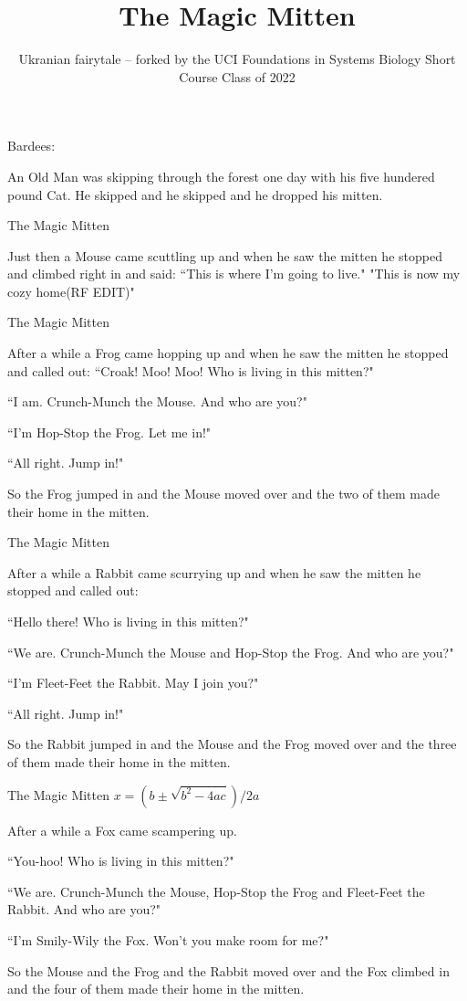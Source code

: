 \documentclass{article}
\title{The Magic Mitten}
\author{Ukranian fairytale -- forked by the UCI Foundations in Systems Biology Short Course Class of 2022}
\begin{document}
\maketitle


Bardees: 

An Old Man was skipping through the forest one day with his five hundered pound Cat. He skipped and he skipped and he dropped his mitten.

The Magic Mitten

Just then a Mouse came scuttling up and when he saw the mitten he stopped and climbed right in and said: ``This is where I'm going to live." "This is now my cozy home(RF EDIT)"

The Magic Mitten

After a while a Frog came hopping up and when he saw the mitten he stopped and called out:
``Croak! Moo! Moo! Who is living in this mitten?"

``I am. Crunch-Munch the Mouse. And who are you?"

``I'm Hop-Stop the Frog. Let me in!"

``All right. Jump in!"

So the Frog jumped in and the Mouse moved over and the two of them made their home in the mitten.

The Magic Mitten

After a while a Rabbit came scurrying up and when he saw the mitten he stopped and called out:

``Hello there! Who is living in this mitten?"

``We are. Crunch-Munch the Mouse and Hop-Stop the Frog. And who are you?"

``I'm Fleet-Feet the Rabbit. May I join you?"

``All right. Jump in!"

So the Rabbit jumped in and the Mouse and the Frog moved over and the three of them made their home in the mitten.

The Magic Mitten $x = \left(b \pm \sqrt{b^2-4ac} \right)/2a$

After a while a Fox came scampering up.

``You-hoo! Who is living in this mitten?"

``We are. Crunch-Munch the Mouse, Hop-Stop the Frog and Fleet-Feet the Rabbit. And who are you?"

``I'm Smily-Wily the Fox. Won't you make room for me?"

So the Mouse and the Frog and the Rabbit moved over and the Fox climbed in and the four of them made their home in the mitten.
\end{document}
